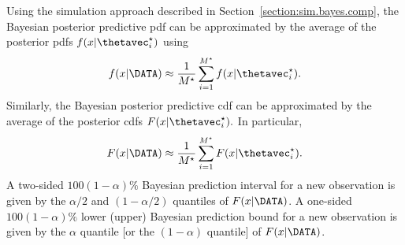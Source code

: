 Using the simulation approach described in 
Section~\ref{section:sim.bayes.comp},
the Bayesian posterior predictive pdf can be  approximated
by the average of the posterior pdfs
$
f(x| \thetavec_{i}^{\star})
$ using
\begin{equation}
\label{equation:bayes.pred.pdf.sim}
f(x|\DATA) \approx \frac{1}{M^{\star}} \sum_{i=1}^{M^{\star}}
f(x| \thetavec_{i}^{\star}).
\end{equation}
Similarly,
the Bayesian posterior predictive cdf can be  approximated
by the average of the posterior cdfs
$
F(x| \thetavec_{i}^{\star}).
$ 
In particular,
\begin{equation}
\label{equation:bayes.pred.cdf.sim}
F(x|\DATA) \approx 
\frac{1}{M^{\star}} \sum_{i=1}^{M^{\star}}
F(x | \thetavec_{i}^{\star}).
\end{equation}
A two-sided $100(1-\alpha)\%$ Bayesian prediction interval for a new
observation is given by the $\alpha/2$ and $(1-\alpha/2)$ quantiles of
$F(x|\DATA)$.  A one-sided $100(1-\alpha)\%$ lower (upper)
Bayesian prediction bound
for a new observation is given by the
$\alpha$ quantile [or the $(1-\alpha)$ quantile] of $F(x|\DATA)$.

